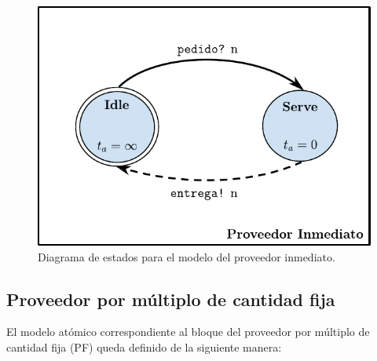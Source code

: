 \documentclass[10pt]{article}
\begin{document}
\begin{figure}[htbp]
	\centering
	\includegraphics{img/proveedorInmediatodevsgraph}
	\caption{Diagrama de estados para el modelo del proveedor inmediato.}
	\label{fig:PI-estados}
\end{figure}
\FloatBarrier

\subsection{Proveedor por múltiplo de cantidad fija\label{sec:PF}}
El modelo atómico correspondiente al bloque del proveedor por múltiplo de cantidad fija (PF) queda definido de la siguiente manera:
\end{document}

